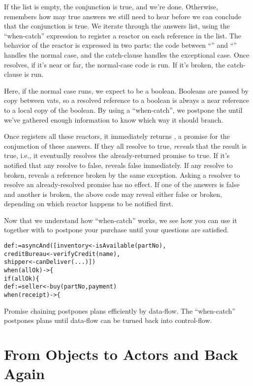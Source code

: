 \documentclass{llncs}
\begin{document}
If the list is empty, the conjunction is true, and we're
done. Otherwise,  remembers how may true answers we
still need to hear before we can conclude that the conjunction is
true. We iterate through the answers list, using the ``when-catch''
expression to register a reactor on each reference in the list. The
behavior of the reactor is expressed in two parts: the code between
``\code{->~\{}'' and ``'' handles the normal case, and
the catch-clause handles the exceptional case. Once 
resolves, if it's near or far, the normal-case code is run. If it's
broken, the catch-clause is run.

Here, if the normal case runs, we expect  to be a
boolean. Booleans are passed by copy between vats, so a resolved
reference to a boolean is always a near reference to a local copy of
the boolean. By using a ``when-catch'', we postpone the 
until we've gathered enough information to know which way it should
branch.

Once  registers all these reactors, it immediately
returns , a promise for the conjunction of these
answers. If they all resolve to true,  \emph{reveals}
that the result is true, i.e., it eventually resolves the
already-returned promise to true. If it's notified that any resolve to
false,  reveals false immediately. If any resolve to
broken,  reveals a reference broken by the same
exception. Asking a resolver to resolve an already-resolved promise
has no effect. If one of the answers is false and another is broken,
the above  code may reveal either false or broken,
depending on which reactor happens to be notified first.

Now that we understand how ``when-catch'' works, we see how you can
use it together with  to postpone your purchase until
your questions are satisfied.
%
\begin{alltt}
    def  := asyncAnd([inventory <- isAvailable(partNo),
                           creditBureau <- verifyCredit(name),
                           shipper <- canDeliver(...)])
    when (allOk) -> \{
        if (allOk) \{
            def  := seller <- buy(partNo, payment)
            when (receipt) -> \{
\end{alltt}
%
Promise chaining postpones plans efficiently by data-flow. The
``when-catch'' postpones plans until data-flow can be turned back into
control-flow.

\section{From Objects to Actors and Back Again}
\end{document}
